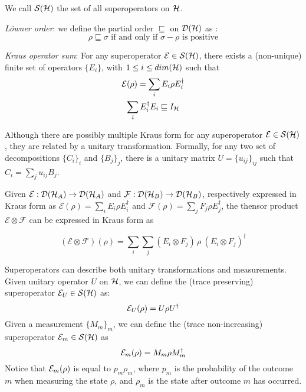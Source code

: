 We call $\mathcal{S}(\mathcal{H})$ the set of all superoperators on $\mathcal{H}$.

 	
\textit{Löwner order}: we define the partial order $\sqsubseteq$ on $\mathcal{D}(\mathcal{H})$ as :
\[ \rho \sqsubseteq \sigma \text{ if and only if } \sigma-\rho \text{ is positive}\]

\textit{Kraus operator sum}: For any superoperator $\mathcal{E} \in \mathcal{S}(\mathcal{H})$, there exists a (non-unique) finite set of operators $\{E_i\}$, with $1 \leq i \leq dim(\mathcal{H})$ such that
\begin{gather*}
\mathcal{E}(\rho) = \sum_i E_i\rho E_i^\dagger \\
\sum_i E_i^\dagger E_i \sqsubseteq I_{\mathcal{H}}
\end{gather*}

Although there are possibly multiple Kraus form for any superoperator $\mathcal{E} \in \mathcal{S}(\mathcal{H})$, they are related by a unitary transformation.
Formally, for any two set of decompositions $\{C_i\}_i$ and $\{B_j\}_j$, there is a unitary matrix $U = \{u_{ij}\}_{ij}$ such that $C_i = \sum_j u_{ij} B_j$.

Given $\mathcal{E}: \mathcal{D}(\mathcal{H}_A) \rightarrow \mathcal{D}(\mathcal{H}_A)$ and $\mathcal{F}: \mathcal{D}(\mathcal{H}_B) \rightarrow \mathcal{D}(\mathcal{H}_B)$,
respectively expressed in Kraus form as $\mathcal{E}(\rho) = \sum_i E_i \rho E_i^\dag$ and $\mathcal{F}(\rho) = \sum_j F_j \rho E_j^\dag$, the thensor product $\mathcal{E} \otimes \mathcal{F}$
can be expressed in Kraus form as 

\[
  (\mathcal{E} \otimes \mathcal{F})(\rho) = \sum_i \sum_j (E_i \otimes F_j)\,\rho\:(E_i \otimes F_j)^\dag
\]

Superoperators can describe both unitary transformations and measurements. Given unitary operator $U$ on $\mathcal{H}$, we can define  the (trace preserving) superoperator $\mathcal{E}_U \in \mathcal{S}(\mathcal{H})$ as:
\[ \mathcal{E}_U(\rho) = U \rho U^\dagger\]
Given a measurement $\{M_m\}_m$, we can define the (trace non-increasing) superoperator $\mathcal{E}_m \in \mathcal{S}(\mathcal{H})$ as 
\[\mathcal{E}_m(\rho) = M_m\rho M_m^\dagger\]
Notice that $\mathcal{E}_m(\rho)$ is equal to $p_m\rho_m$, where $p_m$ is the probability of the outcome $m$ when measuring the state $\rho$, and $\rho_m$ is the state after outcome $m$ has occurred. 
